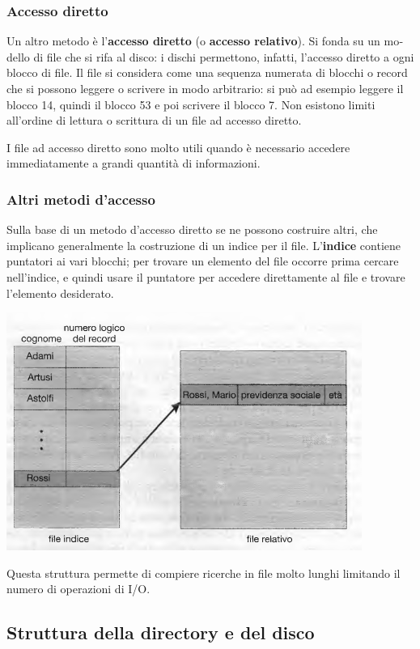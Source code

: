 \documentclass[11pt,a4paper]{article}
\begin{document}
{\subsubsection{Accesso diretto}
Un altro metodo è l'\textbf{accesso diretto} (o \textbf{accesso relativo}). Si fonda su un mo­dello di file che si rifa al disco: i dischi permettono, infatti, l'accesso diretto a ogni blocco di file. Il file si considera come una sequenza numerata di blocchi o record che si possono leg­gere o scrivere in modo arbitrario: si può ad esempio leggere il blocco 14, quindi il blocco 53 e poi scrivere il blocco 7. Non esistono limiti all'ordine di lettura o scrittura di un file ad accesso diretto.

I file ad accesso diretto sono molto utili quando è necessario accedere immediatamen­te a grandi quantità di informazioni.

\subsubsection{Altri metodi d'accesso}
Sulla base di un metodo d'accesso diretto se ne possono costruire altri, che implicano gene­ralmente la costruzione di un indice per il file. L'\textbf{indice} contiene puntatori ai vari blocchi;
per trovare un elemento del file occorre prima cercare nell'indice, e quindi usare il puntato­re per accedere direttamente al file e trovare l'elemento desiderato.
\begin{center}
  \includegraphics[scale=0.6]{img/0061.png}
\end{center}
Questa struttura per­mette di compiere ricerche in file molto lunghi limitando il numero di operazioni di I/O.

\subsection{Struttura della directory e del disco}
}
\end{document}

